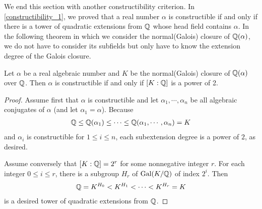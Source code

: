 We end this section with another constructibility criterion.
In \cref{constructibility_1}, we proved that a real number $\alpha$ is constructible if and only if there is a tower of quadratic extensions from ${\mathbb{Q}}$ whose head field contains $\alpha$.
In the following theorem in which we consider the normal(Galois) closure of ${\mathbb{Q}}(\alpha)$, we do not have to consider its subfields but only have to know the extension degree of the Galois closure.
\begin{thm}\label{constructibility_2}
    Let $\alpha$ be a real algebraic number and $K$ be the normal(Galois) closure of ${\mathbb{Q}}(\alpha)$ over ${\mathbb{Q}}$.
    Then $\alpha$ is constructible if and only if $[K:{\mathbb{Q}}]$ is a power of 2.
\end{thm}
\begin{proof}
    Assume first that $\alpha$ is constructible and let $\alpha_1, \cdots, \alpha_n$ be all algebraic conjugates of $\alpha$ (and let $\alpha_1=\alpha$).
    Because
    \begin{align*}
        {\mathbb{Q}}\leq{\mathbb{Q}}(\alpha_1)\leq\cdots\leq{\mathbb{Q}}(\alpha_1, \cdots, \alpha_n)=K
    \end{align*}
    and $\alpha_i$ is constructible for $1\leq i\leq n$, each subextension degree is a power of $2$, as desired.

    Assume conversely that $[K:{\mathbb{Q}}]=2^r$ for some nonnegative integer $r$.
    For each integer $0\leq i\leq r$, there is a subgroup $H_r$ of ${\textrm{Gal}({K/{\mathbb{Q}}})}$ of index $2^i$.
    Then
    \begin{align*}
        {\mathbb{Q}}=K^{H_0} < K^{H_1} < \cdots < K^{H_r}=K
    \end{align*}
    is a desired tower of quadratic extensions from ${\mathbb{Q}}$.
\end{proof}
